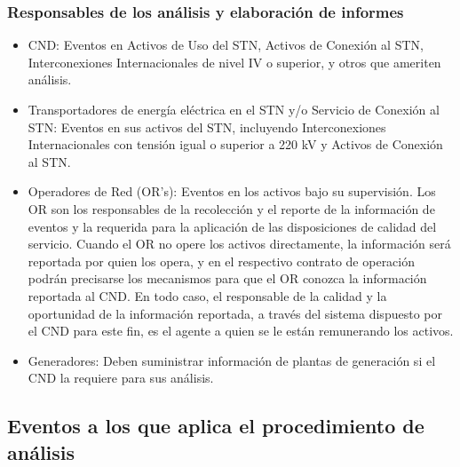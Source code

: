 \documentclass[a5paper]{book}%
\begin{document}
\subsubsection{Responsables de los análisis y elaboración de informes}

\begin{itemize}
  
\item CND: Eventos en Activos de Uso del STN, Activos de Conexión al STN, Interconexiones Internacionales de nivel IV o superior, y otros que ameriten análisis.
    
  \item Transportadores de energía eléctrica en el \ac{STN} y/o Servicio de Conexión al \ac{STN}: Eventos en sus activos del \ac{STN}, incluyendo Interconexiones Internacionales con tensión igual o superior a 220 kV y Activos de Conexión al \ac{STN}.
  
  \item Operadores de Red (OR's): Eventos en los activos bajo su supervisión. Los OR son los responsables de la recolección y el reporte de la información de eventos y la requerida para la aplicación de las disposiciones de calidad del servicio. Cuando el OR no opere los activos directamente, la información será reportada por quien los opera, y en el respectivo contrato de operación podrán precisarse los mecanismos para que el OR conozca la información reportada al CND. En todo caso, el responsable de la calidad y la oportunidad de la información reportada, a través del sistema dispuesto por el CND para este fin, es el agente a quien se le están remunerando los activos.
    
  \item Generadores: Deben suministrar información de plantas de generación si el \ac{CND} la requiere para sus análisis.

\end{itemize}



\subsection{Eventos a los que aplica el procedimiento de análisis}
\end{document}
